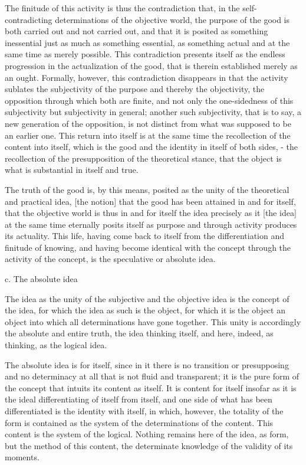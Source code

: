 The finitude of this activity is thus the contradiction that, in the self-
contradicting determinations of the objective world, the purpose of the good
is both carried out and not carried out, and that it is posited as something
inessential just as much as something essential, as something actual and at
the same time as merely possible. This contradiction presents itself as the
endless progression in the actualization of the good, that is therein established
merely as an ought. Formally, however, this contradiction disappears in
that the activity sublates the subjectivity of the purpose and thereby the
objectivity, the opposition through which both are finite, and not only the
one-sidedness of this subjectivity but subjectivity in general; another such
subjectivity, that is to say, a new generation of the opposition, is not distinct
from what was supposed to be an earlier one. This return into itself is at
the same time the recollection of the content into itself, which
is the good and the identity in itself  of both
sides, - the recollection of the presupposition of the theoretical stance,
that the object is what is substantial in itself and true.

The truth of the good is, by this means, posited as
the unity of the theoretical and practical idea,
[the notion] that the good has been attained in and for itself,
that the objective world is thus in and for itself the idea precisely as
it [the idea] at the same time eternally posits itself as purpose and
through activity produces its actuality.
This life, having come back to itself from
the differentiation and finitude of knowing,
and having become identical with the concept
through the activity of the concept,
is the speculative or absolute idea.

c. The absolute idea

The idea as the unity of
the subjective and the objective idea is
the concept of the idea,
for which the idea as such is the object,
for which it is the object
an object into which
all determinations have gone together.
This unity is accordingly
the absolute and entire truth,
the idea thinking itself,
and here, indeed, as thinking,
as the logical idea.

The absolute idea is for itself,
since in it there is no transition or presupposing
and no determinacy at all that is not fluid and transparent;
it is the pure form of the concept
that intuits its content as itself.
It is content for itself
insofar as it is the ideal differentiating of
itself from itself,
and one side of what has been differentiated is
the identity with itself,
in which, however, the totality of the form is
contained as the system of the determinations of the content.
This content is the system of the logical.
Nothing remains here of the idea, as form,
but the method of this content,
the determinate knowledge of the validity of its moments.

